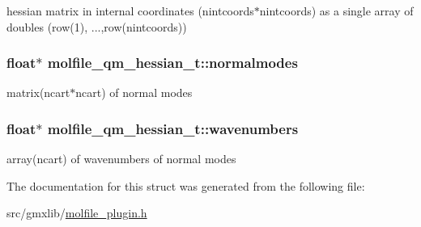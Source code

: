 hessian matrix in internal coordinates (nintcoords$\ast$nintcoords) as a single array of doubles (row(1), ...,row(nintcoords)) \hypertarget{structmolfile__qm__hessian__t_a9800632b69e2bd2190db801f27163bb3}{
\subsubsection[{normalmodes}]{\setlength{\rightskip}{0pt plus 5cm}float$\ast$ {\bf molfile\-\_\-qm\-\_\-hessian\-\_\-t\-::normalmodes}}}\label{structmolfile__qm__hessian__t_a9800632b69e2bd2190db801f27163bb3}
matrix(ncart$\ast$ncart) of normal modes \hypertarget{structmolfile__qm__hessian__t_a80a3bb8710a3a6bc93d1d31777ddbe64}{
\subsubsection[{wavenumbers}]{\setlength{\rightskip}{0pt plus 5cm}float$\ast$ {\bf molfile\-\_\-qm\-\_\-hessian\-\_\-t\-::wavenumbers}}}\label{structmolfile__qm__hessian__t_a80a3bb8710a3a6bc93d1d31777ddbe64}
array(ncart) of wavenumbers of normal modes 

\-The documentation for this struct was generated from the following file\-:\begin{DoxyCompactItemize}
\item 
src/gmxlib/\hyperlink{molfile__plugin_8h}{molfile\-\_\-plugin.\-h}\end{DoxyCompactItemize}
